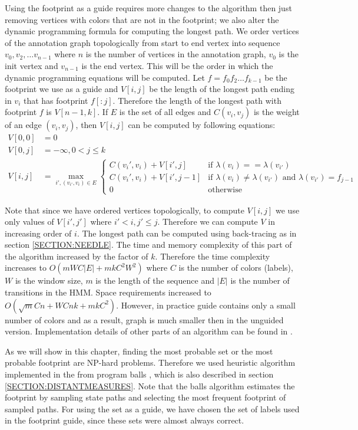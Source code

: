 Using the footprint as a guide requires more changes to the algorithm then just
removing vertices with colors that are not in the footprint; we also alter the
dynamic programming formula for computing the longest path.  We order vertices
of the annotation graph topologically from start to end vertex into sequence
$v_0, v_2, \dots v_{n-1}$ where $n$ is the number of vertices in the annotation
graph, $v_0$ is the init vertex and $v_{n-1}$ is the end vertex.  This will be
the order in which the dynamic programming equations will be computed.  Let
$f=f_0f_2\dots f_{k-1}$ be the footprint we use as a guide and $V[i, j]$ be the
length of the longest path ending in $v_i$ that has footprint $f[:j]$.
Therefore the length of the longest path with footprint $f$ is $V[n - 1, k]$.
If $E$ is the set of all edges and $C(v_i, v_j)$ is the weight of an edge
$(v_i, v_j)$, then $V[i, j]$ can be computed by following equations: 
\begin{align} 
V[0, 0] &= 0 \\ V[0, j] &= -\infty, 0< j \leq k \\
V[i, j] &= \max_{i', (v_{i'}, v_i)\in E} 
\begin{cases} 
C(v_i', v_i) + V[i', j]& \text{if $\lambda(v_i) == \lambda(v_{i'})$}\\
C(v_i', v_i) + V[i', j-1]& \text{if $\lambda(v_i) \not= \lambda(v_{i'})$ and $\lambda(v_{i'})=f_{j-1}$}\\
0 & \text{otherwise} 
\end{cases} 
\end{align}

Note that since we have ordered vertices topologically, to compute $V[i, j]$ we
use only values of $V[i', j']$ where $i'< i, j'\leq j$. Therefore we can compute
$V$ in increasing order of $i$. The longest path can be computed using
back-tracing as in section \ref{SECTION:NEEDLE}. The time and memory complexity 
of this part of the algorithm increased by the factor of $k$. Therefore the
time complexity increases to $O(mWC|E|+mkC^2W^2)$ where $C$ is the number of
colors (labels), $W$ is the window size, $m$ is the length of the sequence and
$|E|$ is the number of transitions in the HMM.  Space requirements increased to
$O(\sqrt{m}Cn+WCnk+mkC^2)$. However, in practice guide contains only a small
number of colors and as a result, graph is much smaller then in the unguided
version. Implementation details of other parts of an algorithm can be found in
\cite{Nanasi2010mgr}.

As we will show in this chapter, finding the most probable set or the most
probable footprint are NP-hard problems.  Therefore we used heuristic algorithm
implemented in the from program balls \cite{Brown2010}, which is also described
in section \ref{SECTION:DISTANTMEASURES}. Note that the balls algorithm
estimates the footprint by sampling state paths and selecting the most
frequent footprint of sampled paths. For using the set as a guide, we have chosen
the set of labels used in the footprint guide, since these sets were almost
always correct. 

